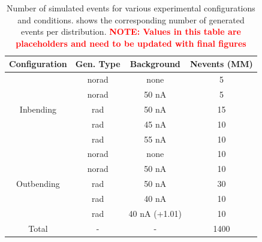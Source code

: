     \begin{table}[h]
        \centering
        \begin{tabular}{c|ccc}
            \textbf{Configuration} & \textbf{Gen. Type} & \textbf{Background} & \textbf{Nevents (MM)} \\ \hline
                & norad & none & 5 \\
                & norad & 50 nA & 5 \\
            Inbending & rad & 50 nA & 15 \\
                & rad & 45 nA & 10 \\
                & rad & 55 nA & 10 \\ \hline
                & norad & none & 10 \\
                & norad &  50 nA & 10 \\
            Outbending & rad & 50 nA & 30 \\
                 & rad & 40 nA & 10 \\
             & rad & 40 nA (+1.01) & 10 \\
            \hline
            Total & - & - & 1400 \\
        \end{tabular}
    \caption[Distribution of Simulated Events by Configuration]{Number of simulated events for various experimental configurations and conditions. shows the corresponding number of generated events per distribution. \textcolor{red}{\textbf{NOTE: Values in this table are placeholders and need to be updated with final figures}}}
    \label{table:simulated_data}
    \end{table}
\fi